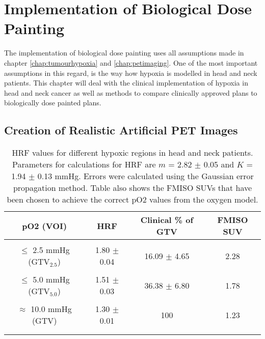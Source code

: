 \section{Implementation of Biological Dose Painting}\label{chapt:clinicalimplementation}
The implementation of biological dose painting uses all assumptions made in chapter \ref{chap:tumourhypoxia} and \ref{chap:petimaging}. One of the most important assumptions in this regard, is the way how hypoxia is modelled in head and neck patients. This chapter will deal with the clinical implementation of hypoxia in head and neck cancer as well as methods to compare clinically approved plans to biologically dose painted plans.
\subsection{Creation of Realistic Artificial PET Images}
\begin{table}[b]
\centering
\small
\begin{tabular}{cccc}
\toprule
pO2 (VOI) & HRF & Clinical \% of GTV & FMISO SUV\\
\midrule\\
$\leq$ 2.5 mmHg (GTV$_{2.5}$) & 1.80 $\pm$ 0.04 & 16.09 $\pm$ 4.65& 2.28\\\\
$\leq$ 5.0 mmHg (GTV$_{5.0}$) & 1.51 $\pm$ 0.03 & 36.38 $\pm$ 6.80 & 1.78\\\\
$\approx$ 10.0 mmHg (GTV)& 1.30 $\pm$ 0.01 & 100 & 1.23\\\\
\bottomrule\\
\end{tabular}
\caption{HRF values for different hypoxic regions in head and neck patients. Parameters for calculations for HRF are $m$ = 2.82 $\pm$ 0.05 and $K$ = 1.94 $\pm$ 0.13 mmHg. Errors were calculated using the Gaussian error propagation method. Table also shows the FMISO SUVs that have been chosen to achieve the correct pO2 values from the oxygen model.}
\label{tab:HRFparameters}
\end{table}
